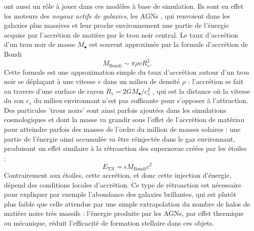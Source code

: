  ont aussi un rôle à jouer dans ces modèles à base de simulation. Ils sont en effet les moteurs des \textit{noyaux actifs de galaxies}, les AGNs , qui renvoient dans les galaxies plus massives et leur proche environnement une partie de l'énergie acquise par l'accrétion de matière par le trou noir central. Le taux d'accrétion d'un trou noir de masse $M_\bullet$ est souvent approximée par la formule d'accrétion de Bondi
\begin{equation}
M_\mathrm{Bondi}\sim \pi \rho v R_s^2.
\end{equation}
Cette formule est une approximation simple du taux d'accrétion autour d'un trou noir se déplaçant à une vitesse $v$ dans un milieu de densité $\rho$ : l'accrétion se fait au travers d'une surface de rayon $R_s=2GM_\bullet/c_s^2$ , qui est la distance où la vitesse du son $c_s$ du milieu environnant n'est pas suffisante pour s'opposer à l'attraction. Des particules 'trous noirs' sont ainsi parfois ajoutées dans les simulations cosmologiques et dont la masse va grandir sous l'effet de l'accrétion de matériau pour atteindre parfois des masses de l'ordre du million de masses solaires : une partie de l'énergie ainsi accumulée va être réinjectée dans le gaz environnant, produisant un effet similaire à la rétroaction des supernovae créées par les étoiles :
\begin{equation}
E_{\mathrm{TN}}=\epsilon M_\mathrm{Bondi} c^2
\end{equation}
Contrairement aux étoiles, cette accrétion, et donc cette injection d'énergie, dépend des conditions locales d'accrétion. Ce type de rétroaction est nécessaire pour expliquer par exemple l'abondance des galaxies brillantes, qui est plutôt plus faible que celle attendue par une simple extrapolation du nombre de halos de matière noire très massifs : l'énergie produite par les AGNs, par effet thermique ou mécanique, réduit l'efficacité de formation stellaire dans ces objets.

